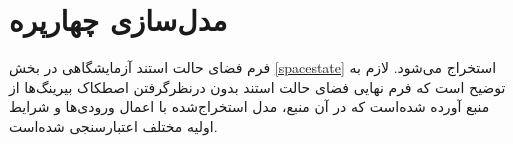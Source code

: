 \chapter{مدل‌سازی چهارپره}
 فرم فضای حالت استند آزمایشگاهی در بخش
 \ref{spacestate}
 استخراج می‌شود. لازم به 
 توضیح است که فرم نهایی فضای حالت استند بدون درنظرگرفتن اصطکاک بیرینگ‌ها از منبع
 \cite{Abeshtan}
 آورده ‌شده‌است که در آن منبع، مدل استخراج‌شده با اعمال ورودی‌ها و شرایط اولیه مختلف 
 اعتبارسنجی شده‌‌است.